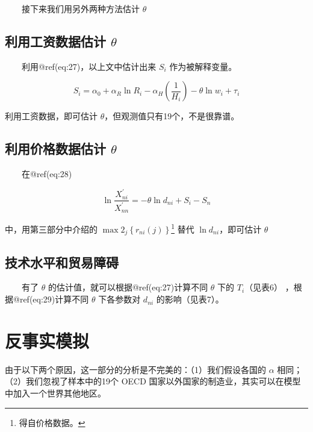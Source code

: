 \documentclass[]{tufte-handout}
\begin{document}
　　接下来我们用另外两种方法估计 \(\theta\)

\hypertarget{ux5229ux7528ux5de5ux8d44ux6570ux636eux4f30ux8ba1-theta}{%
\subsection{\texorpdfstring{利用工资数据估计
\(\theta\)}{利用工资数据估计 \textbackslash theta}}\label{ux5229ux7528ux5de5ux8d44ux6570ux636eux4f30ux8ba1-theta}}

　　利用@ref(eq:27)，以上文中估计出来 \(S_i\) 作为被解释变量。

\[
S_{i}=\alpha_{0}+\alpha_{R} \ln R_{i}-\alpha_{H}\left(\frac{1}{H_{i}}\right)-\theta \ln w_{i}+\tau_{i}
\]

利用工资数据，即可估计 \(\theta\)，但观测值只有19个，不是很靠谱。

\hypertarget{ux5229ux7528ux4ef7ux683cux6570ux636eux4f30ux8ba1-theta}{%
\subsection{\texorpdfstring{利用价格数据估计
\(\theta\)}{利用价格数据估计 \textbackslash theta}}\label{ux5229ux7528ux4ef7ux683cux6570ux636eux4f30ux8ba1-theta}}

　　在@ref(eq:28)

\[\ln \frac{X_{n i}^{\prime}}{X_{n n}^{\prime}}=-\theta \ln d_{n i}+S_i-S_n\]

中，用第三部分中介绍的
\(\max 2_{j}\left\{r_{n i}(j)\right\}\)\footnote{得自价格数据。} 替代
\(\ln d_{n i}\)，即可估计 \(\theta\)

\hypertarget{ux6280ux672fux6c34ux5e73ux548cux8d38ux6613ux969cux788d}{%
\subsection{技术水平和贸易障碍}\label{ux6280ux672fux6c34ux5e73ux548cux8d38ux6613ux969cux788d}}

　　有了 \(\theta\) 的估计值，就可以根据@ref(eq:27)计算不同 \(\theta\)
下的 \(T_i\)（见表6） ，根据@ref(eq:29)计算不同 \(\theta\) 下各参数对
\(d_{ni}\) 的影响（见表7）。

\hypertarget{ux53cdux4e8bux5b9eux6a21ux62df}{%
\section{反事实模拟}\label{ux53cdux4e8bux5b9eux6a21ux62df}}

\begin{marginfigure}
由于以下两个原因，这一部分的分析是不完美的：（1）我们假设各国的
\(\alpha\) 相同；（2）我们忽视了样本中的19个 OECD
国家以外国家的制造业，其实可以在模型中加入一个世界其他地区。
\end{marginfigure}
\end{document}

